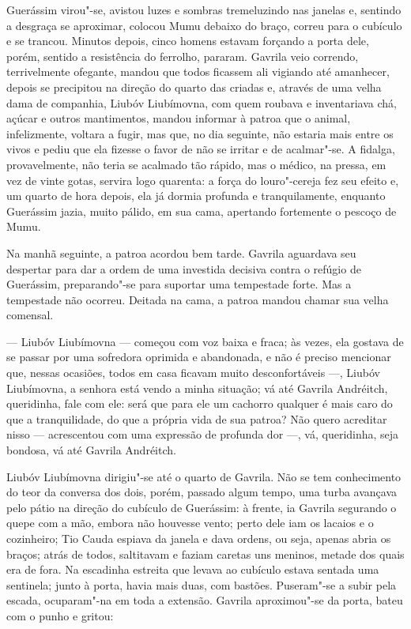 Guerássim virou"-se, avistou luzes e sombras tremeluzindo nas janelas e,
sentindo a desgraça se aproximar, colocou Mumu debaixo do braço, correu
para o cubículo e se trancou. Minutos depois, cinco homens estavam
forçando a porta dele, porém, sentido a resistência do ferrolho,
pararam. Gavrila veio correndo, terrivelmente ofegante, mandou que todos
ficassem ali vigiando até amanhecer, depois se precipitou na direção do
quarto das criadas e, através de uma velha dama de companhia, Liubóv
Liubímovna, com quem roubava e inventariava chá, açúcar e outros
mantimentos, mandou informar à patroa que o animal, infelizmente,
voltara a fugir, mas que, no dia seguinte, não estaria mais entre os
vivos e pediu que ela fizesse o favor de não se irritar e de acalmar"-se.
A fidalga, provavelmente, não teria se acalmado tão rápido, mas o
médico, na pressa, em vez de vinte gotas, servira logo quarenta: a força
do louro"-cereja fez seu efeito e, um quarto de hora depois, ela já
dormia profunda e tranquilamente, enquanto Guerássim jazia, muito
pálido, em sua cama, apertando fortemente o pescoço de Mumu.

Na manhã seguinte, a patroa acordou bem tarde. Gavrila aguardava seu
despertar para dar a ordem de uma investida decisiva contra o refúgio de
Guerássim, preparando"-se para suportar uma tempestade forte. Mas a
tempestade não ocorreu. Deitada na cama, a patroa mandou chamar sua
velha comensal.

--- Liubóv Liubímovna --- começou com voz baixa e fraca; às vezes, ela
gostava de se passar por uma sofredora oprimida e abandonada, e não é
preciso mencionar que, nessas ocasiões, todos em casa ficavam muito
desconfortáveis ---, Liubóv Liubímovna, a senhora está vendo a minha
situação; vá até Gavrila Andréitch, queridinha, fale com ele: será que
para ele um cachorro qualquer é mais caro do que a tranquilidade, do que
a própria vida de sua patroa? Não quero acreditar nisso --- acrescentou
com uma expressão de profunda dor ---, vá, queridinha, seja bondosa, vá
até Gavrila Andréitch.

Liubóv Liubímovna dirigiu"-se até o quarto de Gavrila. Não se tem
conhecimento do teor da conversa dos dois, porém, passado algum tempo,
uma turba avançava pelo pátio na direção do cubículo de Guerássim: à
frente, ia Gavrila segurando o quepe com a mão, embora não houvesse
vento; perto dele iam os lacaios e o cozinheiro; Tio Cauda espiava da
janela e dava ordens, ou seja, apenas abria os braços; atrás de todos,
saltitavam e faziam caretas uns meninos, metade dos quais era de fora.
Na escadinha estreita que levava ao cubículo estava sentada uma
sentinela; junto à porta, havia mais duas, com bastões. Puseram"-se a
subir pela escada, ocuparam"-na em toda a extensão. Gavrila aproximou"-se
da porta, bateu com o punho e gritou:

